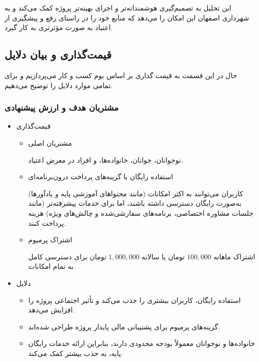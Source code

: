\documentclass[dvipsnames, svgnames, x11names, 11pt]{article}
\begin{document}
این تحلیل به تصمیم‌گیری هوشمندانه‌تر و اجرای بهینه‌تر پروژه کمک می‌کند و به شهرداری اصفهان این امکان را می‌دهد که منابع خود را در راستای رفع و پیشگیری از اعتیاد به صورت مؤثرتری به کار گیرد.

\subsection{قیمت‌گذاری و بیان دلایل}
حال در این قسمت به قیمت گذاری بر اساس بوم کسب و کار می‌پردازیم و برای تمامی موارد دلایل را توضیح می‌دهیم.

\subsubsection{مشتریان هدف و ارزش پیشنهادی}
\begin{itemize}
\item 
قیمت‌گذاری
\begin{itemize}
\item
مشتریان اصلی

نوجوانان، جوانان، خانواده‌ها، و افراد در معرض اعتیاد.

\item
استفاده رایگان با گزینه‌های پرداخت درون‌برنامه‌ای

کاربران می‌توانند به اکثر امکانات (مانند محتواهای آموزشی پایه و یادآورها) به‌صورت رایگان دسترسی داشته باشند، اما برای خدمات پیشرفته‌تر (مانند جلسات مشاوره اختصاصی، برنامه‌های سفارشی‌شده و چالش‌های ویژه) هزینه پرداخت کنند.

\item
اشتراک پرمیوم

اشتراک ماهانه
$100,000$
تومان یا سالانه
$1,000,000$
تومان برای دسترسی کامل به تمام امکانات.
\end{itemize}

\item 
دلایل
\begin{itemize}
\item
استفاده رایگان، کاربران بیشتری را جذب می‌کند و تأثیر اجتماعی پروژه را افزایش می‌دهد.

\item
گزینه‌های پرمیوم برای پشتیبانی مالی پایدار پروژه طراحی شده‌اند.

\item
خانواده‌ها و نوجوانان معمولاً بودجه محدودی دارند، بنابراین ارائه خدمات رایگان پایه، به جذب بیشتر کمک می‌کند.
\end{itemize}
\end{itemize}
\end{document}
